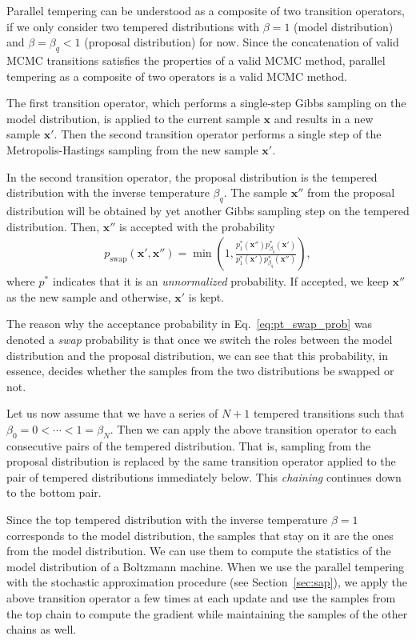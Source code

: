 \documentclass[dissertation,nocontribution,draft*]{aaltoseries}
\newcommand{\vect}[1]{\mathbf{#1}}
\newcommand{\vx}[0]{\vect{x}}
\begin{document}
Parallel tempering can be understood as a composite of two
transition operators, if we only consider two
tempered distributions with $\beta=1$ (model distribution)
and $\beta = \beta_q < 1$ (proposal distribution) for now.  Since
the concatenation of valid MCMC transitions satisfies the
properties of a valid MCMC method, parallel tempering as a
composite of two operators is a valid MCMC method.

The first transition operator, which performs a single-step
Gibbs sampling on the model distribution, is applied to the
current sample $\vx$ and results in a new sample $\vx'$.
Then the second transition operator performs a single step
of the Metropolis-Hastings sampling from the new sample
$\vx'$.

In the second transition operator, the proposal distribution
is the tempered distribution with the inverse temperature
$\beta_q$. The sample $\vx''$ from the proposal distribution
will be obtained by yet another Gibbs sampling step on the
tempered distribution. Then, $\vx''$ is accepted with the
probability
\begin{align}
    \label{eq:pt_swap_prob}
    p_\text{swap} (\vx', \vx'') = \min \left( 1, \frac{p_1^*
    (\vx'') p^*_{\beta_q} (\vx')}{p^*_1(\vx')
    p^*_{\beta_q}(\vx'')}
    \right),
\end{align}
where $p^*$ indicates that it is an \textit{unnormalized}
probability. If accepted, we keep $\vx''$ as the new
sample and otherwise, $\vx'$ is kept.

The reason why the acceptance probability in
Eq.~\eqref{eq:pt_swap_prob} was denoted a \textit{swap}
probability is that once we switch the roles between the
model distribution and the proposal distribution, we can see
that this probability, in essence, decides whether the
samples from the two distributions be swapped or not.

Let us now assume that we have a series of $N+1$ tempered
transitions such that $\beta_0=0 < \cdots < 1 = \beta_N$.
Then we can apply the above transition operator to each
consecutive pairs of the tempered distribution. That is, 
sampling from the proposal distribution is replaced by the
same transition operator applied to the pair of tempered
distributions immediately below. This \textit{chaining}
continues down to the bottom pair.

Since the top tempered distribution with the inverse
temperature $\beta=1$ corresponds to the model distribution,
the samples that stay on it are the ones from the model
distribution. We can use them to compute the statistics of
the model distribution of a Boltzmann machine. When we use
the parallel tempering with the stochastic approximation
procedure (see Section~\ref{sec:sap}), we apply the above
transition operator a few times at each update and use the
samples from the top chain to compute the gradient while
maintaining the samples of the other chains as well.
\end{document}
